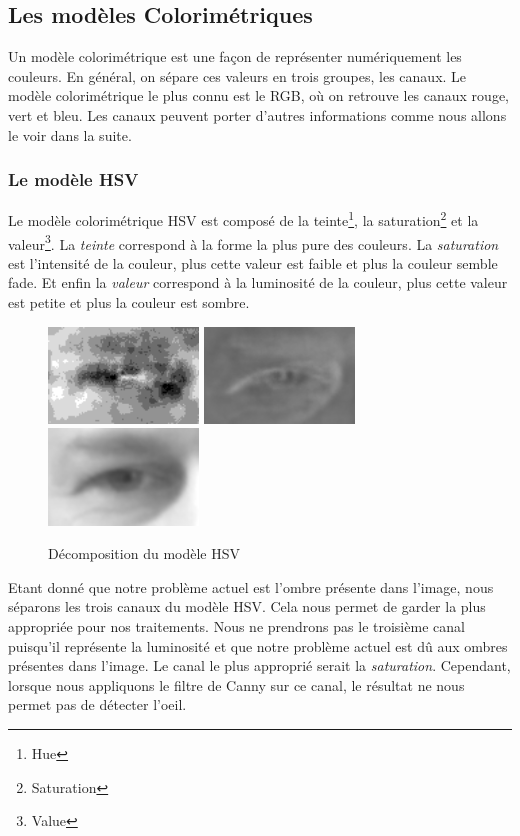\subsection{Les modèles Colorimétriques}
Un modèle colorimétrique est une façon de représenter numériquement les couleurs. En général, on sépare ces valeurs en trois groupes, les canaux.
Le modèle colorimétrique le plus connu est le RGB, où on retrouve les canaux rouge, vert et bleu. Les canaux peuvent porter
d'autres informations comme nous allons le voir dans la suite.

\subsubsection{Le modèle HSV}
Le modèle colorimétrique HSV est composé de la teinte\footnote{Hue}, la saturation\footnote{Saturation} et la valeur\footnote{Value}.
La \textit{teinte} correspond à la forme la plus pure des couleurs. La \textit{saturation} est l'intensité de la couleur, plus cette valeur est faible
et plus la couleur semble fade. Et enfin la \textit{valeur} correspond à la luminosité de la couleur, plus cette valeur est petite et plus la
couleur est sombre.

\begin{figure}[H]
 \center
 \includegraphics[width=4cm]{image/hue.png}
 \includegraphics[width=4cm]{image/saturation.png}
 \includegraphics[width=4cm]{image/value.png}
 \caption{Décomposition du modèle HSV}
\end{figure}

Etant donné que notre problème actuel est l'ombre présente dans l'image, nous séparons les trois canaux du modèle HSV. Cela
nous permet de garder la plus appropriée pour nos traitements. Nous ne prendrons pas le troisième canal puisqu'il représente 
la luminosité et que notre problème actuel est dû aux ombres présentes dans l'image. Le canal le plus approprié serait la \textit{saturation}. 
Cependant, lorsque nous appliquons le filtre de Canny sur ce canal, le résultat ne nous permet pas de détecter l'oeil.

